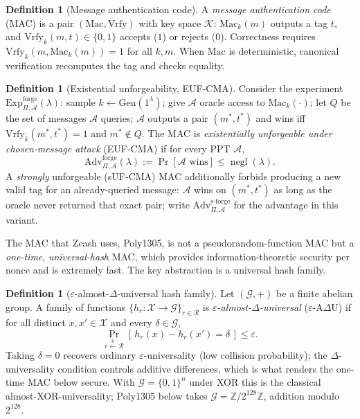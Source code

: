 \documentclass[11pt,a4paper]{article}
\theoremstyle{definition}
\newtheorem{definition}[theorem]{Definition}
\theoremstyle{remark}
\newcommand{\Z}{\ensuremath{\mathbb{Z}}}
\DeclareMathOperator{\negl}{negl}
\begin{document}
\begin{definition}[Message authentication code]\label{symmetric:def-mac}
A \emph{message authentication code} (MAC) is a pair \((\mathrm{Mac}, \mathrm{Vrfy})\) with key space \(\mathcal{K}\): \(\mathrm{Mac}_k(m)\) outputs a tag \(t\), and \(\mathrm{Vrfy}_k(m,t) \in \{0,1\}\) accepts (\(1\)) or rejects (\(0\)). Correctness requires \(\mathrm{Vrfy}_k(m, \mathrm{Mac}_k(m)) = 1\) for all \(k, m\). When \(\mathrm{Mac}\) is deterministic, canonical verification recomputes the tag and checks equality.
\end{definition}

\begin{definition}[Existential unforgeability, EUF-CMA]\label{symmetric:def-eufcma}
Consider the experiment \(\mathrm{Exp}^{\mathrm{forge}}_{\Pi,\mathcal{A}}(\lambda)\): sample \(k \leftarrow \mathrm{Gen}(1^\lambda)\); give \(\mathcal{A}\) oracle access to \(\mathrm{Mac}_k(\cdot)\); let \(Q\) be the set of messages \(\mathcal{A}\) queries; \(\mathcal{A}\) outputs a pair \((m^\ast, t^\ast)\) and wins iff \(\mathrm{Vrfy}_k(m^\ast, t^\ast) = 1\) and \(m^\ast \notin Q\). The MAC is \emph{existentially unforgeable under chosen-message attack} (EUF-CMA) if for every PPT \(\mathcal{A}\),
\[
  \mathrm{Adv}^{\mathrm{forge}}_{\Pi,\mathcal{A}}(\lambda) := \Pr[\mathcal{A} \text{ wins}] \le \negl(\lambda).
\]
A \emph{strongly} unforgeable (sUF-CMA) MAC additionally forbids producing a new valid tag for an already-queried message: \(\mathcal{A}\) wins on \((m^\ast,t^\ast)\) as long as the oracle never returned that exact pair; write \(\mathrm{Adv}^{\mathrm{s\text{-}forge}}_{\Pi,\mathcal{A}}\) for the advantage in this variant.
\end{definition}

The MAC that Zcash uses, \textsf{Poly1305}, is not a pseudorandom-function MAC but a \emph{one-time}, \emph{universal-hash} MAC, which provides information-theoretic security per nonce and is extremely fast. The key abstraction is a universal hash family.

\begin{definition}[\(\varepsilon\)-almost-\(\Delta\)-universal hash family]\label{symmetric:def-axu}
Let \((\mathcal{G}, +)\) be a finite abelian group. A family of functions \(\{h_r : \mathcal{X} \to \mathcal{G}\}_{r \in \mathcal{R}}\) is \emph{\(\varepsilon\)-almost-\(\Delta\)-universal} (\(\varepsilon\)-A\(\Delta\)U) if for all distinct \(x, x' \in \mathcal{X}\) and every \(\delta \in \mathcal{G}\),
\[
  \Pr_{r \xleftarrow{\$} \mathcal{R}}[\,h_r(x) - h_r(x') = \delta\,] \le \varepsilon.
\]
Taking \(\delta = 0\) recovers ordinary \(\varepsilon\)-universality (low collision probability); the \(\Delta\)-universality condition controls additive differences, which is what renders the one-time MAC below secure. With \(\mathcal{G} = \{0,1\}^n\) under XOR this is the classical almost-XOR-universality; \textsf{Poly1305} below takes \(\mathcal{G} = \Z/2^{128}\Z\), addition modulo \(2^{128}\).
\end{definition}
\end{document}
